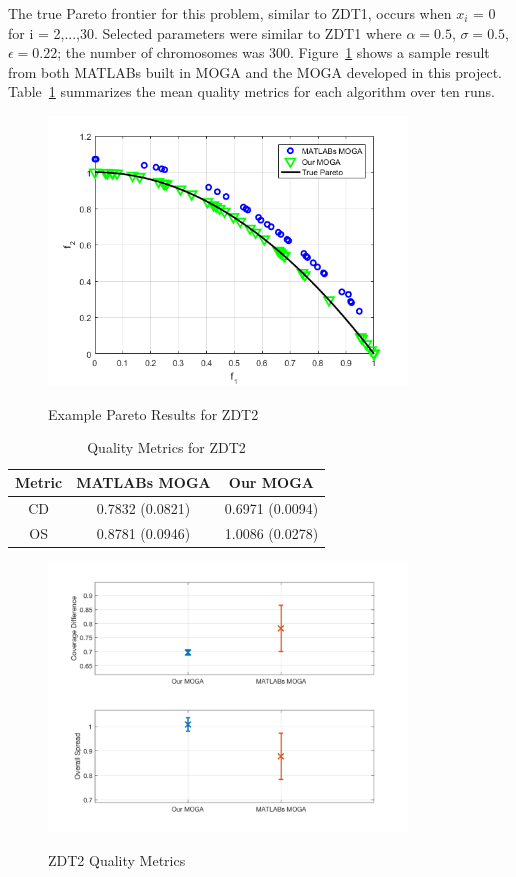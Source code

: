 \documentclass{article}
\begin{document}
\noindent The true Pareto frontier for this problem, similar to ZDT1, occurs when $x_i$ = 0 for i = 2,...,30. Selected parameters were similar to ZDT1 where $\alpha = 0.5$, $\sigma=0.5$, $\epsilon=0.22$; the number of chromosomes was 300. Figure~\ref{fig:ZDT2} shows a sample result from both MATLABs built in MOGA and the MOGA developed in this project. Table~\ref{tab:ZDT2} summarizes the mean quality metrics for each algorithm over ten runs.
\begin{figure}[H]
  \caption{Example Pareto Results for ZDT2}
  \centering
  \includegraphics[width=0.85\textwidth]{ZDT2_pareto_final.png}  
  \label{fig:ZDT2}
\end{figure}

\begin{table}[H]
\caption{Quality Metrics for ZDT2} 
\centering 
\begin{tabular}{|c|c|c|} 
\hline 
Metric & MATLABs MOGA & Our MOGA \\ \hline
CD & 0.7832  (0.0821) & 0.6971  (0.0094) \\ \hline
OS &  0.8781 (0.0946) & 1.0086 (0.0278)  \\ \hline
\end{tabular}
\label{tab:ZDT2} 
\end{table}
\begin{figure}[H]
  \caption{ZDT2 Quality Metrics}
  \centering
  \includegraphics[width=0.85\textwidth]{ZDT2_QM.png}  
  \label{fig:ZDT2_QM}
\end{figure}
\end{document}
